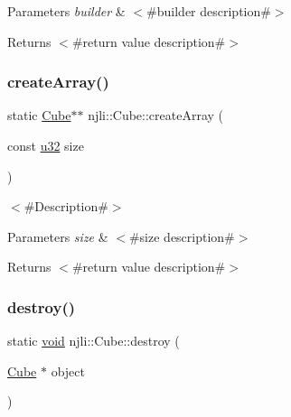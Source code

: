 \begin{DoxyParams}{Parameters}
{\em builder} & $<$\#builder description\#$>$\\
\hline
\end{DoxyParams}
\begin{DoxyReturn}{Returns}
$<$\#return value description\#$>$ 
\end{DoxyReturn}
\mbox{\label{classnjli_1_1_cube_a09daf73917a428668773bc73fc9a50bd}} 
\subsubsection{\texorpdfstring{create\+Array()}{createArray()}}
{\footnotesize\ttfamily static \mbox{\hyperlink{classnjli_1_1_cube}{Cube}}$\ast$$\ast$ njli\+::\+Cube\+::create\+Array (\begin{DoxyParamCaption}\item[{const \mbox{\hyperlink{_util_8h_a10e94b422ef0c20dcdec20d31a1f5049}{u32}}}]{size }\end{DoxyParamCaption})\hspace{0.3cm}{\ttfamily [static]}}

$<$\#\+Description\#$>$


\begin{DoxyParams}{Parameters}
{\em size} & $<$\#size description\#$>$\\
\hline
\end{DoxyParams}
\begin{DoxyReturn}{Returns}
$<$\#return value description\#$>$ 
\end{DoxyReturn}
\mbox{\label{classnjli_1_1_cube_a4c62e4381c762c382f413c66ffe6a3fc}} 
\subsubsection{\texorpdfstring{destroy()}{destroy()}}
{\footnotesize\ttfamily static \mbox{\hyperlink{_thread_8h_af1e856da2e658414cb2456cb6f7ebc66}{void}} njli\+::\+Cube\+::destroy (\begin{DoxyParamCaption}\item[{\mbox{\hyperlink{classnjli_1_1_cube}{Cube}} $\ast$}]{object }\end{DoxyParamCaption})\hspace{0.3cm}{\ttfamily [static]}}

